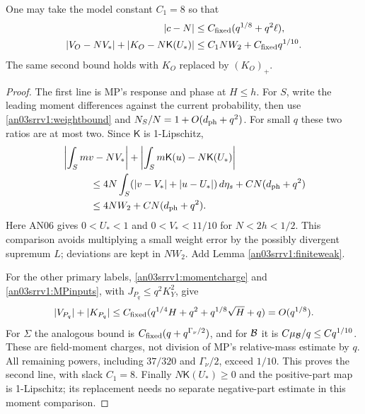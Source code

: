 \documentclass[11pt]{article}
\numberwithin{equation}{section}
\theoremstyle{remark}\newtheorem{remark}[theorem]{Remark}
\newcommand{\dd}{\,d}\newcommand{\E}{\mathbb E}
\newcommand{\Kfun}{\mathsf K}\newcommand{\Ffun}{\mathsf F}
\begin{document}
\begin{proposition}
\label{an03srrv1:weakmoments}
One may take the model constant $C_1=8$ so that
\begin{align}
 |c-N|&\le C_{\rm fixed}(q^{1/8}+q^2\ell),\notag\\
 |V_O-NV_*|+|K_O-N\Kfun(U_*)|
 &\le C_1NW_2+C_{\rm fixed}q^{1/10}.
 \label{an03srrv1:momentcomparison}
\end{align}
The same second bound holds with $K_O$ replaced by $(K_O)_+$.
\end{proposition}
\begin{proof}
The first line is MP's response and phase at $H\le h$.
For $S$, write the leading moment differences against the current
probability, then use \eqref{an03srrv1:weightbound} and
$N_S/N=1+O(d_{\rm ph}+q^2)$. For small $q$ these two ratios
are at most two. Since $\Kfun$ is 1-Lipschitz,
\begin{align*}
 &\left|\int_S mv-NV_*\right|+
   \left|\int_Sm\Kfun(u)-N\Kfun(U_*)\right|\\
 &\hspace{1cm}\le4N\int_S(|v-V_*|+|u-U_*|)\dd\eta_s
                    +C N(d_{\rm ph}+q^2)\\
 &\hspace{1cm}\le4NW_2+C N(d_{\rm ph}+q^2).
\end{align*}
Here AN06 gives $0<U_*<1$ and $0<V_*<11/10$ for $N<2h<1/2$.
This comparison avoids multiplying a small weight error by the
possibly divergent supremum $L$; deviations are kept in $NW_2$.
Add Lemma \ref{an03srrv1:finiteweak}.

For the other primary labels, \eqref{an03srrv1:momentcharge} and
\eqref{an03srrv1:MPinputs}, with $J_{P_q}\le q^2K_Y^2$, give
\[
 |V_{P_q}|+|K_{P_q}|\le
 C_{\rm fixed}(q^{1/4}H+q^2+q^{1/8}\sqrt H+q)=O(q^{1/8}).
\]
For $\Sigma$ the analogous bound is
$C_{\rm fixed}(q+q^{\Gamma_\nu/2})$, and for $\mathcal B$ it is
$C\mu_\mathcal B/q\le Cq^{1/10}$. These are field-moment charges,
not division of MP's relative-mass estimate by $q$.
All remaining powers, including $37/320$ and $\Gamma_\nu/2$,
exceed $1/10$. This proves the second line, with slack $C_1=8$.
Finally $N\Kfun(U_*)\ge0$ and the positive-part map is
1-Lipschitz; its replacement needs no separate negative-part
estimate in this moment comparison.
\end{proof}
\end{document}
